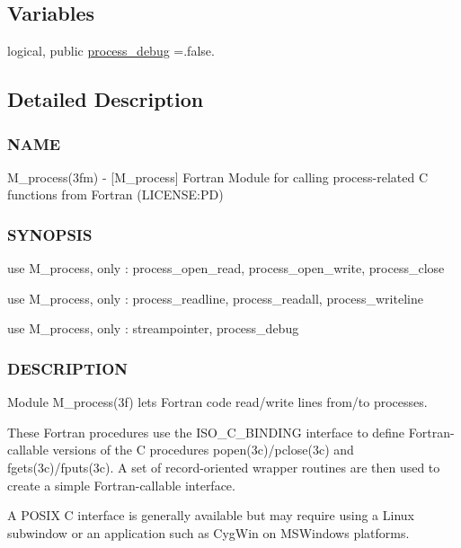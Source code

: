 \subsection*{Variables}
\begin{DoxyCompactItemize}
\item 
logical, public \mbox{\hyperlink{namespacem__process_a0fabee8d01338d5523fbdea5c5f1e894}{process\+\_\+debug}} =.false.
\end{DoxyCompactItemize}


\subsection{Detailed Description}
\subsubsection*{N\+A\+ME}

M\+\_\+process(3fm) -\/ \mbox{[}M\+\_\+process\mbox{]} Fortran Module for calling process-\/related C functions from Fortran (L\+I\+C\+E\+N\+SE\+:PD) 

\subsubsection*{S\+Y\+N\+O\+P\+S\+IS}

\begin{DoxyVerb} use M_process, only : process_open_read, process_open_write, process_close

 use M_process, only : process_readline, process_readall, process_writeline

 use M_process, only : streampointer, process_debug
\end{DoxyVerb}


\subsubsection*{D\+E\+S\+C\+R\+I\+P\+T\+I\+ON}

Module M\+\_\+process(3f) lets Fortran code read/write lines from/to processes.

These Fortran procedures use the I\+S\+O\+\_\+\+C\+\_\+\+B\+I\+N\+D\+I\+NG interface to define Fortran-\/callable versions of the C procedures popen(3c)/pclose(3c) and fgets(3c)/fputs(3c). A set of record-\/oriented wrapper routines are then used to create a simple Fortran-\/callable interface.

A P\+O\+S\+IX C interface is generally available but may require using a Linux subwindow or an application such as Cyg\+Win on M\+S\+Windows platforms.

